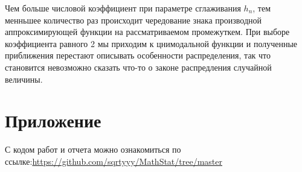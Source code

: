 \documentclass[a4paper]{article}
\begin{document}
        Чем больше числовой коэффициент при параметре сглаживания $h_n$, тем менньшее количество раз происходит чередование знака производной аппроксимирующей функции на рассматриваемом промежуткем. При выборе коэффициента равного 2 мы приходим к цнимодальной функции и полученные приближения перестают описывать особенности распределения, так что становится невозможно сказать что-то о законе распредления случайной величины.



\section{Приложение}

С кодом работ и отчета можно ознакомиться по ссылке:\;\url{https://github.com/sqrtyyy/MathStat/tree/master}
\end{document}
